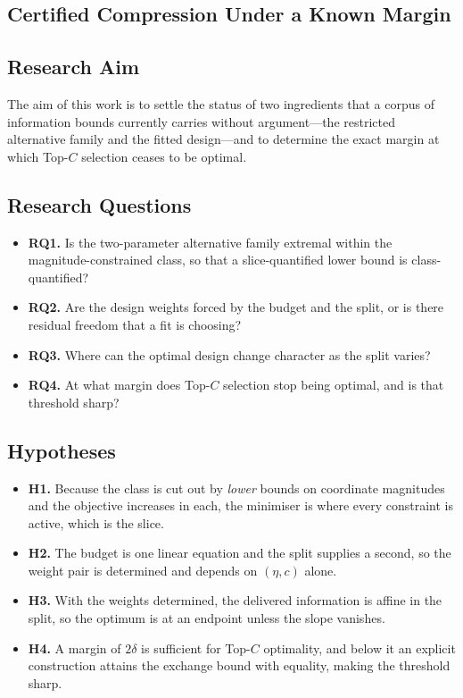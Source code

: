 \subsection{Certified Compression Under a Known Margin}

\subsection{Research Aim}

The aim of this work is to settle the status of two ingredients that a corpus of information
bounds currently carries without argument---the restricted alternative family and the fitted
design---and to determine the exact margin at which Top-$C$ selection ceases to be optimal.

\subsection{Research Questions}

\begin{itemize}
\item \textbf{RQ1.} Is the two-parameter alternative family extremal within the
magnitude-constrained class, so that a slice-quantified lower bound is class-quantified?
\item \textbf{RQ2.} Are the design weights forced by the budget and the split, or is there
residual freedom that a fit is choosing?
\item \textbf{RQ3.} Where can the optimal design change character as the split varies?
\item \textbf{RQ4.} At what margin does Top-$C$ selection stop being optimal, and is that
threshold sharp?
\end{itemize}

\subsection{Hypotheses}

\begin{itemize}
\item \textbf{H1.} Because the class is cut out by \emph{lower} bounds on coordinate
magnitudes and the objective increases in each, the minimiser is where every constraint is
active, which is the slice.
\item \textbf{H2.} The budget is one linear equation and the split supplies a second, so the
weight pair is determined and depends on $(\eta,c)$ alone.
\item \textbf{H3.} With the weights determined, the delivered information is affine in the
split, so the optimum is at an endpoint unless the slope vanishes.
\item \textbf{H4.} A margin of $2\delta$ is sufficient for Top-$C$ optimality, and below it
an explicit construction attains the exchange bound with equality, making the threshold
sharp.
\end{itemize}


